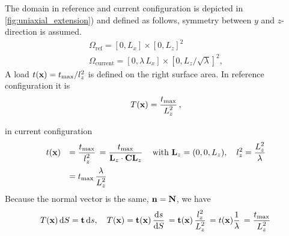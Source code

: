 The domain in reference and current configuration is depicted in \cref{fig:uniaxial_extension}) and defined as follows, symmetry between $y$ and $z$-direction is assumed.
\begin{equation*}
  \begin{array}{lll}
    \Omega_\text{ref} = [0, L_x] \times [0, L_z]^2\\[4mm]
    \Omega_\text{current} = [0, \lambda\,L_x] \times [0, L_z/\sqrt{\lambda}]^2,
  \end{array}
\end{equation*}
A load $t(\textbf{x}) = t_\text{max}/l_z^2$ is defined on the right surface area. In reference configuration it is
\begin{equation*}
  \begin{array}{lll}
    T(\textbf{x}) = \displaystyle\frac{\displaystyle{t_\text{max}}}{\displaystyle{L_z^2}}\,,\\[4mm]
  \end{array}
\end{equation*}
in current configuration
\begin{equation*}
  \begin{array}{lll}
    t(\textbf{x}) &= \displaystyle\frac{\displaystyle{t_\text{max}}}{\displaystyle{l_z^2}}\, = \displaystyle\frac{\displaystyle{t_\text{max}}}{\displaystyle{\textbf{L}_z \cdot\textbf{C}\textbf{L}_z}}\, \quad \text{with }\textbf{L}_z = (0, 0, L_z), \quad l_z^2 = \displaystyle\frac{\displaystyle{L_z^2}}{\displaystyle{\lambda}}\,\\[4mm]
    &= t_\text{max}\,\displaystyle\frac{\displaystyle{\lambda}}{\displaystyle{L_z^2}}\,
  \end{array}
\end{equation*}
Because the normal vector is the same, $\textbf{n} = \textbf{N}$, we have
\begin{equation*}
  \begin{array}{lll}
    T(\bfx)\,\d S = \bft\,\d s, \quad T(\bfx) = \bft(\bfx)\,\dfrac{\d s}{\d S} = \bft(\bfx)\, \dfrac{l_z^2}{L_z^2} = t(\bfx) \dfrac1{\lambda} = \dfrac{t_\text{max}}{L_z^2}
  \end{array}
\end{equation*}

